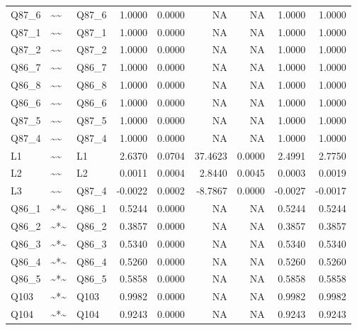 \begin{longtable}{lllrrrrrr}
Q87\_6 & \textasciitilde{}\textasciitilde{} & Q87\_6 & 1.0000 & 0.0000 & NA & NA & 1.0000 & 1.0000\\
\addlinespace
Q87\_1 & \textasciitilde{}\textasciitilde{} & Q87\_1 & 1.0000 & 0.0000 & NA & NA & 1.0000 & 1.0000\\
Q87\_2 & \textasciitilde{}\textasciitilde{} & Q87\_2 & 1.0000 & 0.0000 & NA & NA & 1.0000 & 1.0000\\
Q86\_7 & \textasciitilde{}\textasciitilde{} & Q86\_7 & 1.0000 & 0.0000 & NA & NA & 1.0000 & 1.0000\\
Q86\_8 & \textasciitilde{}\textasciitilde{} & Q86\_8 & 1.0000 & 0.0000 & NA & NA & 1.0000 & 1.0000\\
Q86\_6 & \textasciitilde{}\textasciitilde{} & Q86\_6 & 1.0000 & 0.0000 & NA & NA & 1.0000 & 1.0000\\
\addlinespace
Q87\_5 & \textasciitilde{}\textasciitilde{} & Q87\_5 & 1.0000 & 0.0000 & NA & NA & 1.0000 & 1.0000\\
Q87\_4 & \textasciitilde{}\textasciitilde{} & Q87\_4 & 1.0000 & 0.0000 & NA & NA & 1.0000 & 1.0000\\
L1 & \textasciitilde{}\textasciitilde{} & L1 & 2.6370 & 0.0704 & 37.4623 & 0.0000 & 2.4991 & 2.7750\\
L2 & \textasciitilde{}\textasciitilde{} & L2 & 0.0011 & 0.0004 & 2.8440 & 0.0045 & 0.0003 & 0.0019\\
L3 & \textasciitilde{}\textasciitilde{} & Q87\_4 & -0.0022 & 0.0002 & -8.7867 & 0.0000 & -0.0027 & -0.0017\\
\addlinespace
Q86\_1 & \textasciitilde{}*\textasciitilde{} & Q86\_1 & 0.5244 & 0.0000 & NA & NA & 0.5244 & 0.5244\\
Q86\_2 & \textasciitilde{}*\textasciitilde{} & Q86\_2 & 0.3857 & 0.0000 & NA & NA & 0.3857 & 0.3857\\
Q86\_3 & \textasciitilde{}*\textasciitilde{} & Q86\_3 & 0.5340 & 0.0000 & NA & NA & 0.5340 & 0.5340\\
Q86\_4 & \textasciitilde{}*\textasciitilde{} & Q86\_4 & 0.5260 & 0.0000 & NA & NA & 0.5260 & 0.5260\\
Q86\_5 & \textasciitilde{}*\textasciitilde{} & Q86\_5 & 0.5858 & 0.0000 & NA & NA & 0.5858 & 0.5858\\
\addlinespace
Q103 & \textasciitilde{}*\textasciitilde{} & Q103 & 0.9982 & 0.0000 & NA & NA & 0.9982 & 0.9982\\
Q104 & \textasciitilde{}*\textasciitilde{} & Q104 & 0.9243 & 0.0000 & NA & NA & 0.9243 & 0.9243\\

\end{longtable}
